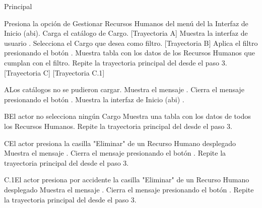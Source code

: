 \begin{UCtrayectoria}{Principal}

    \UCpaso[\UCactor] Presiona la opción de Gestionar Recursos Humanos del menú del la Interfaz de Inicio (abi).
    \UCpaso Carga el catálogo de Cargo. [Trayectoria A]
    \UCpaso Muestra la interfaz de usuario .
    \UCpaso[\UCactor] Selecciona el Cargo que desea como filtro. [Trayectoria B]
    \UCpaso[\UCactor] Aplica el filtro presionando el botón .
    \UCpaso Muestra tabla con los datos de los Recursos Humanos que cumplan con el filtro.
    \UCpaso Repite la trayectoria principal del  desde el paso 3. [Trayectoria C] [Trayectoria C.1]
\end{UCtrayectoria}


\begin{UCtrayectoriaA}{A}{Los catálogos no se pudieron cargar.}
    \UCpaso Muestra el mensaje .
    \UCpaso[\UCactor] Cierra el mensaje presionando el botón .
    \UCpaso Muestra la interfaz de Inicio (abi) .
\end{UCtrayectoriaA}


\begin{UCtrayectoriaA}{B}{El actor no selecciona ningún Cargo}
    \UCpaso Muestra una tabla con los datos de todos los Recursos Humanos.
    \UCpaso Repite la trayectoria principal del  desde el paso 3.

\end{UCtrayectoriaA}


\begin{UCtrayectoriaA}{C}{El actor presiona la casilla "Eliminar" de un Recurso Humano desplegado}
    \UCpaso Muestra el mensaje .
    \UCpaso[\UCactor] Cierra el mensaje presionando el botón .
    \UCpaso Repite la trayectoria principal del  desde el paso 3.
\end{UCtrayectoriaA}

\begin{UCtrayectoriaA}{C.1}{El actor presiona por accidente la casilla "Eliminar" de un Recurso Humano desplegado}
    \UCpaso Muestra el mensaje .
    \UCpaso[\UCactor] Cierra el mensaje presionando el botón .
    \UCpaso Repite la trayectoria principal del  desde el paso 3.
\end{UCtrayectoriaA}

